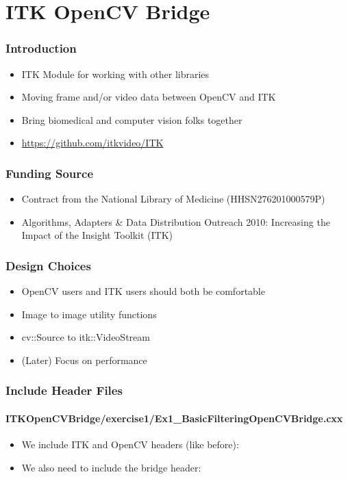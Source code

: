 \section{ITK OpenCV Bridge}



\begin{frame}
\frametitle{Introduction}
\begin{itemize}
\item ITK Module for working with other libraries
\item Moving frame and/or video data between OpenCV and ITK
\item Bring biomedical and computer vision folks together
\item \url{https://github.com/itkvideo/ITK}
\end{itemize}
\end{frame}

\begin{frame}
\frametitle{Funding Source}
\begin{itemize}
\item Contract from the National Library of Medicine (HHSN276201000579P)
\item Algorithms, Adapters \& Data Distribution Outreach 2010:
  Increasing the Impact of the Insight Toolkit (ITK)
\end{itemize}
\end{frame}

\begin{frame}
\frametitle{Design Choices}
\begin{itemize}
\item OpenCV users and ITK users should both be comfortable
\item Image to image utility functions
\item cv::Source to itk::VideoStream
\item (Later) Focus on performance
\end{itemize}
\end{frame}



\begin{frame}
\frametitle{Include Header Files}
\framesubtitle{ITKOpenCVBridge/exercise1/Ex1\_BasicFilteringOpenCVBridge.cxx}
\begin{itemize}
\item We include ITK and OpenCV headers (like before):
\item We also need to include the bridge header:
\end{itemize}
\end{frame}

